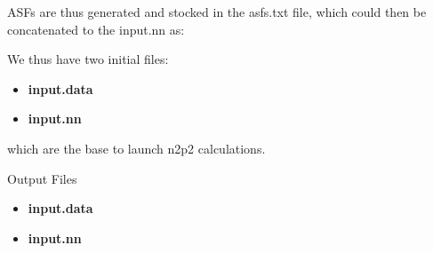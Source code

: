 \documentclass[12pt]{article}
\begin{document}
ASFs are thus generated and stocked in the asfs.txt file, which could then be concatenated to the input.nn as:
\begin{center}
\end{center}
We thus have two initial files:
\begin{itemize}
    \item \textbf{input.data}
    \item \textbf{input.nn}
\end{itemize}
which are the base to launch n2p2 calculations.
\\
\begin{mybox3}{Output Files}
\begin{itemize}
    \item \textbf{input.data}
    \item \textbf{input.nn} 
\end{itemize}
\end{mybox3}
%
\end{document}
